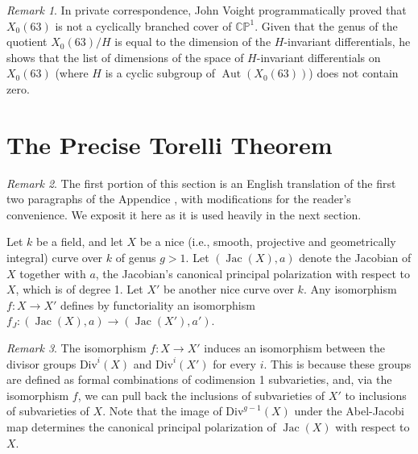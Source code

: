 \documentclass[12pt,reqno]{amsart}
\DeclareMathOperator{\Aut}{Aut}
\DeclareMathOperator{\Jac}{Jac}
\newcommand{\C}{\mathbb{C}}
\renewcommand{\P}{\mathbb{P}}
\theoremstyle{definition}
\theoremstyle{remark}
\newtheorem*{remark}{Remark}
\begin{document}
\begin{remark} In private correspondence, John Voight programmatically proved that $X_0(63)$ is not a cyclically branched cover of $\C\P^1.$ Given that the genus of the quotient $X_0(63)/H$ is equal to the dimension of the $H$-invariant differentials, he shows that the list of dimensions of the space of $H$-invariant differentials on $X_0(63)$ (where $H$ is a cyclic subgroup of $\Aut(X_0(63))$) does not contain zero. 
 \end{remark} 




\section{The Precise Torelli Theorem}
\label{sec:torelli}


\begin{remark} The first portion of this section is an English translation of the first two paragraphs of the Appendice \cite{Torelli}, with modifications for the reader's convenience. We exposit it here as it is used heavily in the next section. \end{remark}

Let $k$ be a field, and let $X$ be a nice (i.e., smooth, projective and geometrically integral) curve over $k$ of genus $g > 1$.  Let $(\operatorname{Jac}(X),a)$ denote the Jacobian of $X$ together with $a$, the Jacobian's canonical principal polarization with respect to $X$, which is of degree 1.  Let $X'$ be another nice curve over $k.$ Any isomorphism $f: X \to X'$ defines by functoriality an isomorphism $f_J: (\Jac(X), a) \to (\Jac(X'), a')$. 

\begin{remark} The isomorphism $f: X \to X'$ induces an isomorphism between the divisor groups $\text{Div}^i(X)$ and $\text{Div}^i(X')$ for every $i$. This is because these groups are defined as formal combinations of codimension 1 subvarieties, and, via the isomorphism $f$, we can pull back the inclusions of subvarieties of $X'$ to inclusions of subvarieties of $X$. Note that the image of $\text{Div}^{g-1}(X)$ under the Abel-Jacobi map determines the canonical principal polarization of $\Jac(X)$ with respect to $X$. \end{remark}

\end{document}
